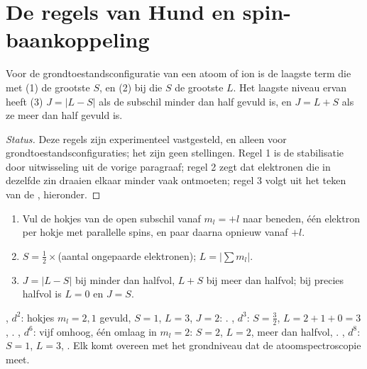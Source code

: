\section{De regels van Hund en spin-baankoppeling}

\begin{proposition}\label{prop:b3:many-electron-atoms:hund-terms}
Voor de grondtoestandsconfiguratie van een atoom of ion is de laagste term
die met (1) de grootste $S$, en (2) bij die $S$ de grootste $L$. Het laagste
niveau ervan heeft (3) $J = |L - S|$ als de subschil minder dan half
gevuld is, en $J = L +
S$ als ze meer dan half gevuld is.
\end{proposition}
\begin{proof}[Status]
Deze regels zijn experimenteel vastgesteld, en alleen voor
grondtoestandsconfiguraties; het zijn geen stellingen. Regel 1 is de
stabilisatie door uitwisseling uit de vorige paragraaf; regel 2 zegt dat
elektronen die in dezelfde zin draaien elkaar minder vaak ontmoeten;
regel 3 volgt uit het teken van de , hieronder.
\end{proof}

\begin{method}\label{met:b3:many-electron-atoms:ground-term}
\begin{enumerate}
  \item Vul de hokjes van de open subschil vanaf $m_l = +l$ naar beneden,
        één elektron per hokje met parallelle spins, en paar daarna
        opnieuw vanaf $+l$.
  \item $S = \frac12 \times$(aantal ongepaarde elektronen); $L = |\sum m_l|$.
  \item $J = |L - S|$ bij minder dan halfvol, $L + S$ bij meer dan halfvol;
        bij precies halfvol is $L = 0$ en $J = S$.
\end{enumerate}
\end{method}

\begin{example}[Grondtermen]\label{ex:b3:many-electron-atoms:ground-terms}
, $d^2$: hokjes $m_l = 2, 1$ gevuld, $S = 1$, $L = 3$, $J = 2$:
. , $d^3$: $S = \frac32$, $L = 2 + 1 + 0 = 3$,
. , $d^6$: vijf omhoog, één omlaag in $m_l = 2$:
$S = 2$, $L = 2$, meer dan halfvol, . , $d^8$:
$S = 1$, $L = 3$, . Elk komt overeen met het grondniveau
dat de atoomspectroscopie meet.
\end{example}

